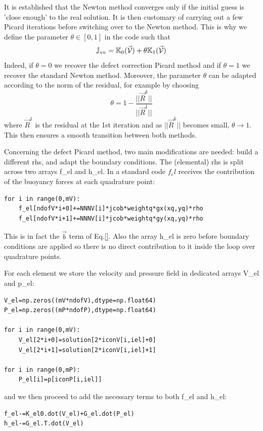 It is established that the Newton method converges only if the initial guess is 'close enough'
to the real solution. It is then customary of carrying out a few Picard iterations 
before switching over to the Newton method. 
This is why we define the parameter $\theta\in[0,1]$ in the code such that 
\[
{\mathbb{J}}_{vv} = {\mathbb{K}}_0(\vec{\cal V})+\theta {\mathbb{K}}_1(\vec{\cal V})
\]
Indeed, if $\theta=0$ we recover the defect correction Picard method and
if $\theta=1$ we recover the standard Newton method. 
Moreover, the parameter $\theta$ can be adapted according to the norm of 
the residual, for example by choosing 
\[
\theta = 1 - \frac{||\vec{R}^k||}{||\vec{R}^1||}
\]
where $\vec{R}^1$ is the residual at the 1st iteration and 
as $||\vec{R}^k||$ becomes small, $\theta \rightarrow 1$.
This then ensures a smooth transition between both methods.

Concerning the defect Picard method, two main modifications 
are needed: build a different rhs, and adapt the boundary conditions. 
The (elemental) rhs is split across two arrays {\codefont f\_el} and {\codefont h\_el}.
In a standard code $f_el$ receives the contribution of the buoyancy forces at 
each quadrature point:
\begin{lstlisting}
for i in range(0,mV):
    f_el[ndofV*i+0]+=NNNV[i]*jcob*weightq*gx(xq,yq)*rho
    f_el[ndofV*i+1]+=NNNV[i]*jcob*weightq*gy(xq,yq)*rho
\end{lstlisting}
This is in fact the $\vec{b}$ term of Eq.\eqref{}. 
Also the array {\codefont h\_el} is zero before boundary conditions are
applied so there is no direct contribution to it inside the loop over 
quadrature points.

For each element we store the velocity and pressure field in dedicated arrays
{\codefont V\_el} and {\codefont p\_el}:

\begin{lstlisting}
V_el=np.zeros((mV*ndofV),dtype=np.float64)
P_el=np.zeros((mP*ndofP),dtype=np.float64)

for i in range(0,mV):
    V_el[2*i+0]=solution[2*iconV[i,iel]+0]
    V_el[2*i+1]=solution[2*iconV[i,iel]+1]

for i in range(0,mP):
    P_el[i]=p[iconP[i,iel]]
\end{lstlisting}
and we then proceed to add the necessary terms to both {\codefont f\_el} and {\codefont h\_el}:
\begin{lstlisting}
f_el-=K_el0.dot(V_el)+G_el.dot(P_el) 
h_el-=G_el.T.dot(V_el)               
\end{lstlisting}


